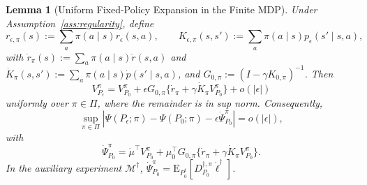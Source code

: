 \documentclass[12pt]{article}
\newtheorem{lemma}[theorem]{Lemma}
\theoremstyle{remark}\newtheorem{remark}[theorem]{Remark}\theoremstyle{plain}
\newcommand{\E}{\mathrm{E}}
\begin{document}
\begin{lemma}[Uniform Fixed-Policy Expansion in the Finite MDP]
\label{lem:finite_mdp_uniform_expansion}
    Under Assumption~\ref{ass:regularity}, define
    \[
        r_{\epsilon,\pi}(s)
        :=\sum_a\pi(a\mid s)r_\epsilon(s,a),
        \qquad
        K_{\epsilon,\pi}(s,s')
        :=\sum_a\pi(a\mid s)p_\epsilon(s'\mid s,a),
    \]
    with
    $\dot r_\pi(s):=\sum_a\pi(a\mid s)\dot r(s,a)$ and
    $\dot K_\pi(s,s')
      :=\sum_a\pi(a\mid s)\dot p(s'\mid s,a)$,
    and $G_{0,\pi}:=(I-\gamma K_{0,\pi})^{-1}$.  Then
    \[
        V_{P_\epsilon}^{\pi}
        =V_{P_0}^{\pi}
        +\epsilon G_{0,\pi}
        \{\dot r_\pi+\gamma\dot K_\pi V_{P_0}^{\pi}\}
        +o(|\epsilon|)
    \]
    uniformly over $\pi\in\Pi$, where the remainder is in sup norm.
    Consequently,
    \begin{equation}\label{eq:finite_mdp_uniform_expansion}
        \sup_{\pi\in\Pi}
        \left|
        \Psi(P_\epsilon;\pi)-\Psi(P_0;\pi)
        -\epsilon\dot\Psi_{P_0}^{\pi}
        \right|
        =o(|\epsilon|),
    \end{equation}
    with
    \[
        \dot\Psi_{P_0}^{\pi}
        =
        \dot\mu^\top V_{P_0}^{\pi}
        +
        \mu_0^\top G_{0,\pi}
        \{\dot r_\pi+\gamma\dot K_\pi V_{P_0}^{\pi}\}.
    \]
    In the auxiliary experiment $\mathcal M^\dagger$,
    $\dot\Psi_{P_0}^{\pi}
      =\E_{P_0^\dagger}
      [D_{P_0}^{\dagger,\pi}\dot\ell^\dagger]$.
\end{lemma}
\end{document}
